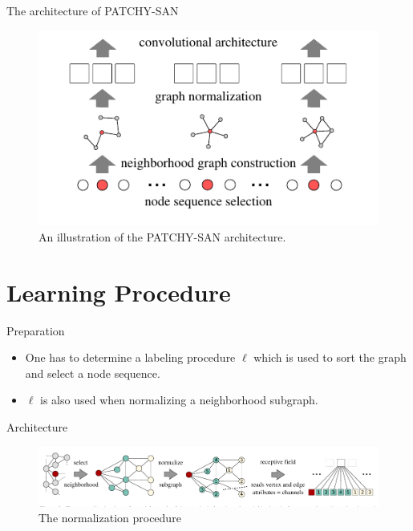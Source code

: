 \documentclass[dvipdfmx]{beamer}
\begin{document}
  \begin{frame}{The architecture of PATCHY-SAN}
    \begin{figure}[h]
      \centering
      \includegraphics[width=0.8\paperwidth]{img/Fig2.pdf}
      \caption{An illustration of the PATCHY-SAN architecture.}
    \end{figure}
  \end{frame}

\section{Learning Procedure}

  \begin{frame}{Preparation}
    \begin{itemize}
      \item One has to determine a \alert{labeling procedure $\ell$} which is used to sort the graph and
        select a node sequence.
      \item $\ell$ is also used when normalizing a neighborhood subgraph.
    \end{itemize}
  \end{frame}

  \begin{frame}{Architecture}
    \begin{figure}[h]
      \centering
      \includegraphics[width=0.9\paperwidth]{img/Fig3.pdf}
      \caption{The normalization procedure}
    \end{figure}
  \end{frame}
\end{document}

